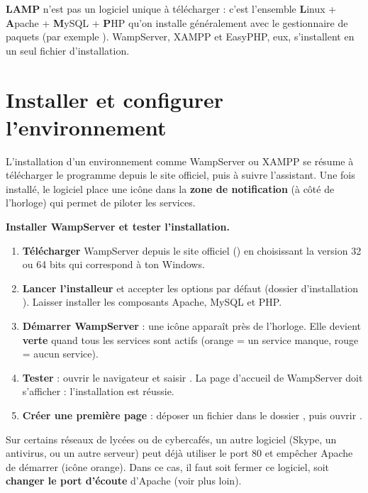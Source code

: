 \begin{remarque}
\textbf{LAMP} n'est pas un logiciel unique à télécharger : c'est l'ensemble
\textbf{L}inux + \textbf{A}pache + \textbf{M}ySQL + \textbf{P}HP qu'on installe
généralement avec le gestionnaire de paquets (par exemple
). WampServer, XAMPP et EasyPHP, eux,
s'installent en un seul fichier d'installation.
\end{remarque}

\section{Installer et configurer l'environnement}

L'installation d'un environnement comme WampServer ou XAMPP se résume à télécharger
le programme depuis le site officiel, puis à suivre l'assistant. Une fois installé,
le logiciel place une icône dans la \textbf{zone de notification} (à côté de
l'horloge) qui permet de piloter les services.

\begin{methode}
\textbf{Installer WampServer et tester l'installation.}
\begin{enumerate}[label=\arabic*)]
  \item \textbf{Télécharger} WampServer depuis le site officiel
        () en choisissant la version 32 ou 64 bits qui
        correspond à ton Windows.
  \item \textbf{Lancer l'installeur} et accepter les options par défaut (dossier
        d'installation ). Laisser installer les
        composants Apache, MySQL et PHP.
  \item \textbf{Démarrer WampServer} : une icône apparaît près de l'horloge. Elle
        devient \textbf{verte} quand tous les services sont actifs (orange = un
        service manque, rouge = aucun service).
  \item \textbf{Tester} : ouvrir le navigateur et saisir .
        La page d'accueil de WampServer doit s'afficher : l'installation est réussie.
  \item \textbf{Créer une première page} : déposer un fichier  dans
        le dossier , puis ouvrir .
\end{enumerate}
\end{methode}

\begin{attention}
Sur certains réseaux de lycées ou de cybercafés, un autre logiciel (Skype, un
antivirus, ou un autre serveur) peut déjà utiliser le port 80 et empêcher Apache de
démarrer (icône orange). Dans ce cas, il faut soit fermer ce logiciel, soit
\textbf{changer le port d'écoute} d'Apache (voir plus loin).
\end{attention}

